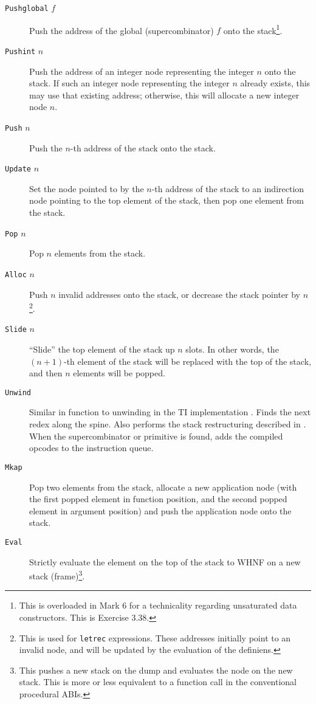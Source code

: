 \begin{description}
\item[\texttt{Pushglobal} $f$] Push the address of the global (supercombinator) $f$ onto the stack\footnote{This is overloaded in Mark 6 for a technicality regarding unsaturated data constructors. This is Exercise 3.38.}.
\item[\texttt{Pushint} $n$] Push the address of an integer node representing the integer $n$ onto the stack. If such an integer node representing the integer $n$ already exists, this may use that existing address; otherwise, this will allocate a new integer node $n$.
\item[\texttt{Push} $n$] Push the $n$-th address of the stack onto the stack.
\item[\texttt{Update} $n$] Set the node pointed to by the $n$-th address of the stack to an indirection node pointing to the top element of the stack, then pop one element from the stack.
\item[\texttt{Pop} $n$] Pop $n$ elements from the stack.
\item[\texttt{Alloc} $n$] Push $n$ invalid addresses onto the stack, or decrease the stack pointer by $n$ \footnote{This is used for \texttt{letrec} expressions. These addresses initially point to an invalid node, and will be updated by the evaluation of the definiens.}.
\item[\texttt{Slide} $n$] ``Slide'' the top element of the stack up $n$ slots. In other words, the $(n+1)$-th element of the stack will be replaced with the top of the stack, and then $n$ elements will be popped.
\item[\texttt{Unwind}] Similar in function to unwinding in the TI implementation . Finds the next redex along the spine. Also performs the stack restructuring described in . When the supercombinator or primitive is found, adds the compiled opcodes to the instruction queue.
\item[\texttt{Mkap}] Pop two elements from the stack, allocate a new application node (with the first popped element in function position, and the second popped element in argument position) and push the application node onto the stack.
\item[\texttt{Eval}] Strictly evaluate the element on the top of the stack to WHNF on a new stack (frame)\footnote{This pushes a new stack on the dump and evaluates the node on the new stack. This is more or less equivalent to a function call in the conventional procedural ABIs.}.

\end{description}
